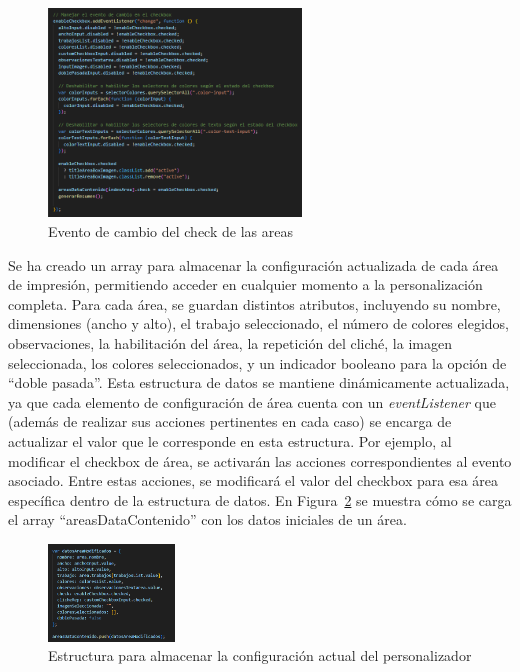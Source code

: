 \documentclass[11pt]{article}
\begin{document}
\begin{figure}[H]
    \centering
    \includegraphics[width=0.6\textwidth]{imagenesUS3-modal/manejoDesabilitarElementos.png}
    \caption{\label{fig:deshabilitarElementos} Evento de cambio del check de las areas}
    \vspace{\fill}
\end{figure}

Se ha creado un array para almacenar la configuración actualizada de cada área de impresión, permitiendo acceder en cualquier momento a la personalización completa.
Para cada área, se guardan distintos atributos, incluyendo su nombre, dimensiones (ancho y alto), el trabajo seleccionado, 
el número de colores elegidos, observaciones, la habilitación del área, la repetición del cliché, la imagen seleccionada, 
los colores seleccionados, y un indicador booleano para la opción de ``doble pasada''. Esta estructura de datos se mantiene dinámicamente actualizada,
ya que cada elemento de configuración de área cuenta con un \textit{eventListener} que (además de realizar sus acciones pertinentes en cada caso) se encarga de actualizar el 
valor que le corresponde en esta estructura. Por ejemplo, al modificar el checkbox de área, se activarán las acciones correspondientes 
al evento asociado. Entre estas acciones, se modificará el valor del checkbox para esa área específica dentro de la estructura de datos.
En Figura~\ref{fig:variableConfiguracion} se muestra cómo se carga el array ``areasDataContenido'' con los datos iniciales de un área.

\begin{figure}[H]
    \centering
    \includegraphics[width=0.3\textwidth]{imagenesUS3-modal/variableDatosArreglada.png}
    \caption{\label{fig:variableConfiguracion} Estructura para almacenar la configuración actual del personalizador}
    \vspace{\fill}
\end{figure}
\end{document}

